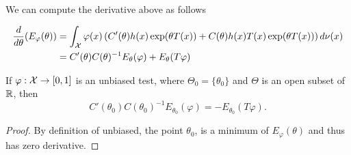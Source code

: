\documentclass[twoside, a4paper, 10pt]{amsart}
\begin{document}
We can compute the derivative above as follows

\begin{align*} \frac{d}{d\theta}(E_{\varphi}(\theta)) &= \int_{\mathcal{X}} \varphi(x)\left(C'(\theta)h(x) \exp(\theta T(x)) + C(\theta)h(x)T(x) \exp(\theta T(x)) \right) d\nu(x) \\
&= C'(\theta)C(\theta)^{-1} E_{\theta}(\varphi) + E_{\theta}(T \varphi) \end{align*}

\begin{prop}\label{prop: one-param unbiased derivative} If $\varphi:\mathcal{X} \to [0,1]$ is an unbiased test, where $\Theta_0 = \{ \theta_0 \}$ and $\Theta$ is an open subset of $\mathbb{R}$, then $$C'(\theta_0)C(\theta_0)^{-1} E_{\theta_0}(\varphi) = - E_{\theta_0}(T \varphi).$$

\end{prop}

\begin{proof} By definition of unbiased, the point $\theta_0$, is a minimum of $E_{\varphi}(\theta)$ and thus has zero derivative. \end{proof}
\end{document}

